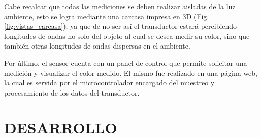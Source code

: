 \documentclass[12pt,a4paper,twoside,fleqn]{article}
\begin{document}
Cabe recalcar que todas las mediciones se deben realizar aisladas de la luz ambiente, esto se logra mediante una carcasa impresa en 3D 
(Fig. \ref{fig:vistas_carcasa}), ya que de no ser así el transductor estará percibiendo longitudes de ondas no solo del objeto al cual se desea medir su color, sino que también otras longitudes de ondas dispersas en el ambiente.

Por último, el sensor cuenta con un panel de control que permite solicitar una medición y visualizar el color medido. El mismo fue realizado en una página web, la  cual es servida por el microcontrolador encargado del muestreo y procesamiento de los datos del transductor.


\section*{DESARROLLO}
\end{document}
